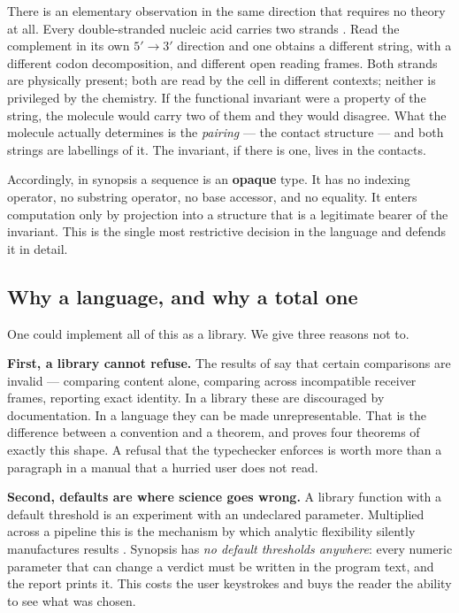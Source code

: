 \documentclass[11pt,twocolumn,a4paper]{article}
\theoremstyle{plain}
\theoremstyle{definition}
\theoremstyle{remark}
\begin{document}
There is an elementary observation in the same direction that requires no
theory at all. Every double-stranded nucleic acid carries two strands
\cite{watson1953molecular}. Read the complement in its own $5'\to3'$
direction and one obtains a different string, with a different codon
decomposition, and different open reading frames. Both strands are
physically present; both are read by the cell in different contexts;
neither is privileged by the chemistry. If the functional invariant were
a property of the string, the molecule would carry two of them and they
would disagree. What the molecule actually determines is the
\emph{pairing} --- the contact structure --- and both strings are
labellings of it. The invariant, if there is one, lives in the contacts.

Accordingly, in synopsis a sequence is an \textbf{opaque} type. It has no
indexing operator, no substring operator, no base accessor, and no
equality. It enters computation only by projection into a structure that
is a legitimate bearer of the invariant. This is the single most
restrictive decision in the language and  defends it in
detail.

\subsection{Why a language, and why a total one}
\label{sec:whylanguage}

One could implement all of this as a library. We give three reasons not
to.

\textbf{First, a library cannot refuse.} The results of
 say that certain comparisons are invalid ---
comparing content alone, comparing across incompatible receiver frames,
reporting exact identity. In a library these are discouraged by
documentation. In a language they can be made unrepresentable. That is
the difference between a convention and a theorem, and
 proves four theorems of exactly this shape. A refusal
that the typechecker enforces is worth more than a paragraph in a manual
that a hurried user does not read.

\textbf{Second, defaults are where science goes wrong.} A library
function with a default threshold is an experiment with an
undeclared parameter. Multiplied across a pipeline this is the
mechanism by which analytic flexibility silently manufactures results
\cite{simmons2011false,gelman2013garden}. Synopsis has \emph{no default
thresholds anywhere}: every numeric parameter that can change a verdict
must be written in the program text, and the report prints it. This
costs the user keystrokes and buys the reader the ability to see what
was chosen.
\end{document}
